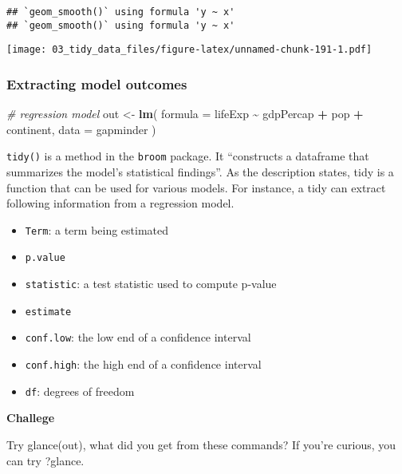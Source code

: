 \documentclass[
]{book}
\newenvironment{Shaded}{\begin{snugshade}}{\end{snugshade}}
\newcommand{\CommentTok}[1]{\textcolor[rgb]{0.56,0.35,0.01}{\textit{#1}}}
\newcommand{\DataTypeTok}[1]{\textcolor[rgb]{0.13,0.29,0.53}{#1}}
\newcommand{\KeywordTok}[1]{\textcolor[rgb]{0.13,0.29,0.53}{\textbf{#1}}}
\newcommand{\NormalTok}[1]{#1}
\newcommand{\OperatorTok}[1]{\textcolor[rgb]{0.81,0.36,0.00}{\textbf{#1}}}
\newcommand{\StringTok}[1]{\textcolor[rgb]{0.31,0.60,0.02}{#1}}
\providecommand{\tightlist}{%
  \setlength{\itemsep}{0pt}\setlength{\parskip}{0pt}}
\begin{document}
\begin{verbatim}
## `geom_smooth()` using formula 'y ~ x'
## `geom_smooth()` using formula 'y ~ x'
\end{verbatim}

\texttt{[image: 03\_tidy\_data\_files/figure-latex/unnamed-chunk-191-1.pdf]}

\hypertarget{extracting-model-outcomes}{%
\subsubsection{Extracting model outcomes}\label{extracting-model-outcomes}}

\begin{Shaded}
\begin{Highlighting}[]
\CommentTok{\# regression model}
\NormalTok{out \textless{}{-}}\StringTok{ }\KeywordTok{lm}\NormalTok{(}
  \DataTypeTok{formula =}\NormalTok{ lifeExp }\OperatorTok{\textasciitilde{}}\StringTok{ }\NormalTok{gdpPercap }\OperatorTok{+}\StringTok{ }\NormalTok{pop }\OperatorTok{+}\StringTok{ }\NormalTok{continent,}
  \DataTypeTok{data =}\NormalTok{ gapminder}
\NormalTok{)}
\end{Highlighting}
\end{Shaded}

\texttt{tidy()} is a method in the \texttt{broom} package. It ``constructs a dataframe that summarizes the model's statistical findings''. As the description states, tidy is a function that can be used for various models. For instance, a tidy can extract following information from a regression model.

\begin{itemize}
\tightlist
\item
  \texttt{Term}: a term being estimated
\item
  \texttt{p.value}
\item
  \texttt{statistic}: a test statistic used to compute p-value
\item
  \texttt{estimate}
\item
  \texttt{conf.low}: the low end of a confidence interval
\item
  \texttt{conf.high}: the high end of a confidence interval
\item
  \texttt{df}: degrees of freedom
\end{itemize}

\textbf{Challege}

Try glance(out), what did you get from these commands? If you're curious, you can try ?glance.
\end{document}

